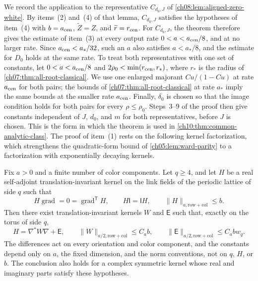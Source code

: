 We record the application to the representative $C_{d_0,J}$ of \cref{ch08:lem:aligned-zero-white}. By items~(2) and~(4) of that lemma, $C_{d_0,J}$ satisfies the hypotheses of item~(4) with $b=a_{\rm cen}$, $\widetilde Z=Z$, and $\widetilde r=r_{\rm cen}$. For $C_{d_0,J}$, the theorem therefore gives the estimate of item~(3) at every output rate $0<a<a_{\rm cen}/8$, and at no larger rate. Since $a_{\rm cen}<a_*/32$, such an $a$ also satisfies $a<a_*/8$, and the estimate for $D_0$ holds at the same rate. To treat both representatives with one set of constants, let $0<a<a_{\rm cen}/8$ and $2\rho_0<\min(r_{\rm cen},r_*)$, where $r_*$ is the radius of \cref{ch07:thm:all-root-classical}. We use one enlarged majorant $Cu/(1-Cu)$ at rate $a_{\rm cen}$ for both pairs; the bounds of \cref{ch07:thm:all-root-classical} at rate $a_*$ imply the same bounds at the smaller rate $a_{\rm cen}$. Finally, $\delta_0$ is chosen so that the image condition holds for both pairs for every $\rho\le\rho_0$. Steps~3--9 of the proof then give constants independent of $J$, $d_0$, and $m$ for both representatives, before $J$ is chosen. This is the form in which the theorem is used in \cref{ch10:thm:common-analytic-class}. The proof of item~(1) rests on the following kernel factorization, which strengthens the quadratic-form bound of \cref{ch05:lem:ward-parity} to a factorization with exponentially decaying kernels.

\begin{lemma}\label{ch08:lem:two-differences}
Fix $a>0$ and a finite number of color components. Let $q\ge4$, and let $H$ be a real self-adjoint translation-invariant kernel on the link fields of the periodic lattice of side $q$ such that
\[
 H\operatorname{grad}=0=\operatorname{grad}^{\mathsf T}H,\qquad
 H\mathsf I=\mathsf IH,\qquad
 \|H\|_{a,\mathrm{row+col}}\le b.
\]
Then there exist translation-invariant kernels $W$ and $\mathsf E$ such that, exactly on the torus of side $q$,
\[
 H=\nabla^*W\nabla+\mathsf E,\qquad
 \|W\|_{a/2,\mathrm{row+col}}\le C_ab,\qquad
 \|\mathsf E\|_{a/2,\mathrm{row+col}}\le C_abw_q.
\]
The differences act on every orientation and color component, and the constants depend only on $a$, the fixed dimension, and the norm conventions, not on $q$, $H$, or $b$. The conclusion also holds for a complex symmetric kernel whose real and imaginary parts satisfy these hypotheses.
\end{lemma}

